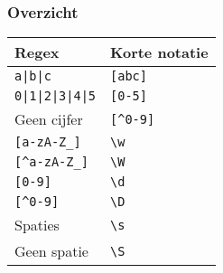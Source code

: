 \begin{frame}
  \frametitle{Overzicht}
  \begin{center}
    \begin{tabular}{ll}
      \toprule
      \textbf{Regex} & \textbf{Korte notatie} \\
      \midrule
      \texttt{a|b|c} & \texttt{[abc]} \\
      \texttt{0|1|2|3|4|5} & \texttt{[0-5]} \\
      Geen cijfer & \texttt{[\^{}0-9]} \\
      \texttt{[a-zA-Z\_]} & \texttt{\textbackslash w} \\
      \texttt{[\^{}a-zA-Z\_]} & \texttt{\textbackslash W} \\
      \texttt{[0-9]} & \texttt{\textbackslash d} \\
      \texttt{[\^{}0-9]} & \texttt{\textbackslash D} \\ 
      Spaties & \texttt{\textbackslash s} \\
      Geen spatie & \texttt{\textbackslash S} \\
      \bottomrule
    \end{tabular}
  \end{center}
\end{frame}

